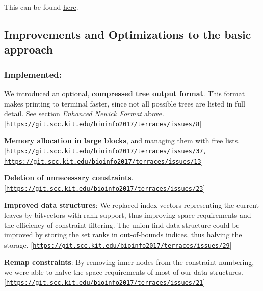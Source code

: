 This can be found \hyperlink{md_documentation_walkthrough}{here}.

\subsection*{Improvements and Optimizations to the basic approach}

\subsubsection*{Implemented\+:}


\begin{DoxyItemize}
\item We introduced an optional, {\bfseries compressed tree output format}. This format makes printing to terminal faster, since not all possible trees are listed in full detail. See section {\itshape Enhanced Newick Format} above. \mbox{[}\href{https://git.scc.kit.edu/bioinfo2017/terraces/issues/8}{\tt https\+://git.\+scc.\+kit.\+edu/bioinfo2017/terraces/issues/8}\mbox{]}
\item {\bfseries Memory allocation in large blocks}, and managing them with free lists. \mbox{[}\href{https://git.scc.kit.edu/bioinfo2017/terraces/issues/37,}{\tt https\+://git.\+scc.\+kit.\+edu/bioinfo2017/terraces/issues/37,} \href{https://git.scc.kit.edu/bioinfo2017/terraces/issues/13}{\tt https\+://git.\+scc.\+kit.\+edu/bioinfo2017/terraces/issues/13}\mbox{]}
\item {\bfseries Deletion of unnecessary constraints}. \mbox{[}\href{https://git.scc.kit.edu/bioinfo2017/terraces/issues/23}{\tt https\+://git.\+scc.\+kit.\+edu/bioinfo2017/terraces/issues/23}\mbox{]}
\item {\bfseries Improved data structures}\+: We replaced index vectors representing the current leaves by bitvectors with rank support, thus improving space requirements and the efficiency of constraint filtering. The union-\/find data structure could be improved by storing the set ranks in out-\/of-\/bounds indices, thus halving the storage. \mbox{[}\href{https://git.scc.kit.edu/bioinfo2017/terraces/issues/29}{\tt https\+://git.\+scc.\+kit.\+edu/bioinfo2017/terraces/issues/29}\mbox{]}
\item {\bfseries Remap constraints}\+: By removing inner nodes from the constraint numbering, we were able to halve the space requirements of most of our data structures. \mbox{[}\href{https://git.scc.kit.edu/bioinfo2017/terraces/issues/21}{\tt https\+://git.\+scc.\+kit.\+edu/bioinfo2017/terraces/issues/21}\mbox{]}

\end{DoxyItemize}
